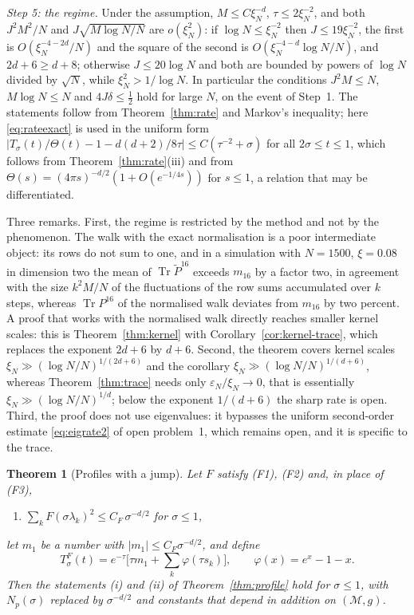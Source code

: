 \documentclass[11pt,a4paper]{article}
\makeatletter
\theoremstyle{stmt}
\newtheorem{theorem}{Theorem}[section]
\theoremstyle{defn}
\theoremstyle{rmk}
\renewenvironment{proof}[1][\proofname]{\par\pushQED{\qed}\normalfont\topsep6\p@\@plus6\p@\relax
  \trivlist\item[\hskip\labelsep{\sffamily\itshape\small #1.}]\ignorespaces}{\popQED\endtrivlist\@endpefalse}
\numberwithin{equation}{section}
\DeclareMathOperator{\Tr}{Tr}
\newcommand{\M}{\mathcal{M}}
\makeatother
\begin{document}
{\begin{proof}
\emph{Step 5: the regime.} Under the assumption, $M\le C\xi_N^{-d}$, $\tau\le2\xi_N^{-2}$, and both $J^2M^2/N$ and $J\sqrt{M\log N/N}$ are $o(\xi_N^2)$: if $\log N\le\xi_N^{-2}$ then $J\le19\xi_N^{-2}$, the first is $O(\xi_N^{-4-2d}/N)$ and the square of the second is $O(\xi_N^{-4-d}\log N/N)$, and $2d+6\ge d+8$; otherwise $J\le20\log N$ and both are bounded by powers of $\log N$ divided by $\sqrt N$, while $\xi_N^2>1/\log N$. In particular the conditions $J^2M\le N$, $M\log N\le N$ and $4J\delta\le\frac12$ hold for large $N$, on the event of Step~1. The statements follow from Theorem~\ref{thm:rate} and Markov's inequality; here \eqref{eq:rateexact} is used in the uniform form $|T_\sigma(t)/\Theta(t)-1-d(d+2)/8\tau|\le C(\tau^{-2}+\sigma)$ for all $2\sigma\le t\le1$, which follows from Theorem~\ref{thm:rate}(iii) and from $\Theta(s)=(4\pi s)^{-d/2}(1+O(e^{-1/4s}))$ for $s\le1$, a relation that may be differentiated.
\end{proof}

Three remarks. First, the regime is restricted by the method and not by the phenomenon. The walk with the exact normalisation is a poor intermediate object: its rows do not sum to one, and in a simulation with $N=1500$, $\xi=0.08$ in dimension two the mean of $\Tr\tilde P^{16}$ exceeds $m_{16}$ by a factor two, in agreement with the size $k^2M/N$ of the fluctuations of the row sums accumulated over $k$ steps, whereas $\Tr P^{16}$ of the normalised walk deviates from $m_{16}$ by two percent. A proof that works with the normalised walk directly reaches smaller kernel scales: this is Theorem~\ref{thm:kernel} with Corollary~\ref{cor:kernel-trace}, which replaces the exponent $2d+6$ by $d+6$. Second, the theorem covers kernel scales $\xi_N\gg(\log N/N)^{1/(2d+6)}$ and the corollary $\xi_N\gg(\log N/N)^{1/(d+6)}$, whereas Theorem~\ref{thm:trace} needs only $\varepsilon_N/\xi_N\to0$, that is essentially $\xi_N\gg(\log N/N)^{1/d}$; below the exponent $1/(d+6)$ the sharp rate is open. Third, the proof does not use eigenvalues: it bypasses the uniform second-order estimate \eqref{eq:eigrate2} of open problem~1, which remains open, and it is specific to the trace.

\begin{theorem}[Profiles with a jump]\label{thm:profileHS}
Let $F$ satisfy \textup{(F1)}, \textup{(F2)} and, in place of \textup{(F3)},
\begin{enumerate}[label=\textup{(F\arabic*$'$)},start=3]
\item $\sum_kF(\sigma\lambda_k)^2\le C_F\,\sigma^{-d/2}$ for $\sigma\le1$,
\end{enumerate}
let $m_1$ be a number with $|m_1|\le C_F\sigma^{-d/2}$, and define
\[
T^F_\sigma(t)=e^{-\tau}\Big[\tau m_1+\sum_k\varphi(\tau s_k)\Big],\qquad\varphi(x)=e^x-1-x .
\]
Then the statements \textup{(i)} and \textup{(ii)} of Theorem~\ref{thm:profile} hold for $\sigma\le1$, with $N_p(\sigma)$ replaced by $\sigma^{-d/2}$ and constants that depend in addition on $(\M,g)$.
\end{theorem}

}
\end{document}
